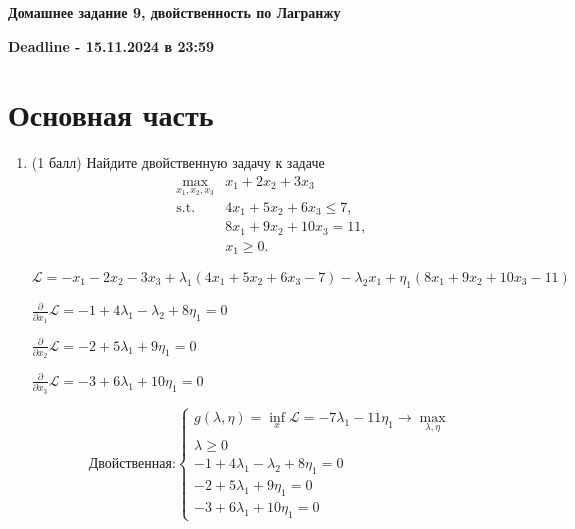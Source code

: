 \documentclass[a5paper,twoside,russian]{article}
\begin{document}
    \begin{center}
        \textbf{Домашнее задание 9, двойственность по Лагранжу}
    \end{center}
    \begin{center}
        \textbf{Deadline - 15.11.2024 в 23:59}
    \end{center}

    \section*{Основная часть}

    \begin{enumerate}[label=\textbf{Задача \arabic*.}]

        \item (1 балл) Найдите двойственную задачу к задаче
        \begin{equation*}
            \begin{aligned}
                \max_{x_1, x_2, x_3} & x_1 + 2x_2 + 3x_3 \\
                \text{s.t.} \quad & 4x_1 + 5x_2 + 6x_3 \leq 7, \\
                & 8x_1 + 9x_2 + 10x_3 = 11, \\
                & x_1 \geq 0.
            \end{aligned}
        \end{equation*}

        \begin{prf}
            $\mathcal{L} = -x_1 - 2x_2 - 3x_3 + \lambda_1 (4x_1 + 5x_2 + 6x_3 - 7) - \lambda_2 x_1 + \eta_1 (8x_1 + 9x_2 + 10x_3 - 11)$

            $\frac{\partial}{\partial{x_1}} \mathcal{L} = -1 + 4\lambda_1 - \lambda_2 + 8\eta_1=  0$

            $\frac{\partial}{\partial{x_2}} \mathcal{L} = -2 + 5\lambda_1 + 9\eta_1=0$

            $\frac{\partial}{\partial{x_3}} \mathcal{L} = -3 + 6\lambda_1 + 10\eta_1=0$

            \[
                \text{Двойственная:}
                \left\{\!
                \begin{array}{l}
                    g(\lambda, \eta) = \inf\limits_{x} \mathcal{L} = -7 \lambda_1 - 11\eta_1 \rightarrow \max\limits_{\lambda, \eta}\\
                    \lambda \geq 0                                                                                                   \\
                    -1 + 4\lambda_1 - \lambda_2 + 8\eta_1=  0                                                                          \\
                    -2 + 5\lambda_1 + 9\eta_1=0                                                                                      \\
                    -3 + 6\lambda_1 + 10\eta_1=0
                \end{array}
                \right.
            \]
        \end{prf}


\end{enumerate}
\end{document}
